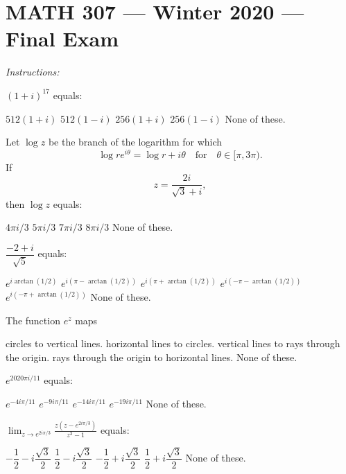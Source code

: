 \documentclass[12pt]{exam}
\begin{document}
\section*{MATH 307 --- Winter 2020 --- Final Exam}


\bigskip
\emph{Instructions:} 
\bigskip
\begin{questions}
    \setlength\itemsep{2em}
    \setlength\parskip{1em}
\question $(1+i)^{17}$ equals:
    \begin{choices}
\choice $512(1+i)$
\choice $512(1-i)$
\choice $256(1+i)$
\choice $256(1-i)$
\choice None of these.
    \end{choices}

\question
Let $\log z$ be the branch of the logarithm for which
\[
    \log re^{i\theta} = \log r + i\theta\quad\text{for}\quad
    \theta\in[\pi, 3\pi).
\]
If
\[
    z=\frac{2i}{\sqrt3 + i},
\]
then $\log z$ equals:
\begin{choices}
    \choice $4\pi i/3$
    \choice $5\pi i/3$
    \choice $7\pi i/3$
    \choice $8\pi i/3$
    \choice None of these.
\end{choices}

\question
$\dfrac{-2+i}{\sqrt 5}$ equals:

\begin{choices}
    \choice $e^{i\arctan(1/2)}$
    \choice $e^{i(\pi - \arctan(1/2))}$
    \choice $e^{i(\pi + \arctan(1/2))}$
    \choice $e^{i(-\pi - \arctan(1/2))}$
    \choice $e^{i(-\pi + \arctan(1/2))}$
    \choice None of these.
\end{choices}

\question
The function $e^z$ maps
\begin{choices}
    \choice circles to vertical lines.
    \choice horizontal lines to circles.
    \choice vertical lines to rays through the origin.
    \choice rays through the origin to horizontal lines.
    \choice None of these.
\end{choices}


\question
$e^{2020\pi i/11}$ equals:
\begin{choices}
    \choice $e^{-4i\pi/11}$
    \choice $e^{-9i\pi/11}$
    \choice $e^{-14i\pi/11}$
    \choice $e^{-19i\pi/11}$
    \choice None of these.
\end{choices}

\question
$\displaystyle\lim_{z\to e^{2i\pi/3}}\frac{z(z-e^{2i\pi/3})}{z^3-1}$ equals:
\begin{choices}
    \choice $-\dfrac12 - i\dfrac{\sqrt3}2$
    \choice $\dfrac12 - i\dfrac{\sqrt3}2$
    \choice $-\dfrac12 + i\dfrac{\sqrt3}2$
    \choice $\dfrac12 + i\dfrac{\sqrt3}2$
    \choice None of these.
\end{choices}


\end{questions}
\end{document}
